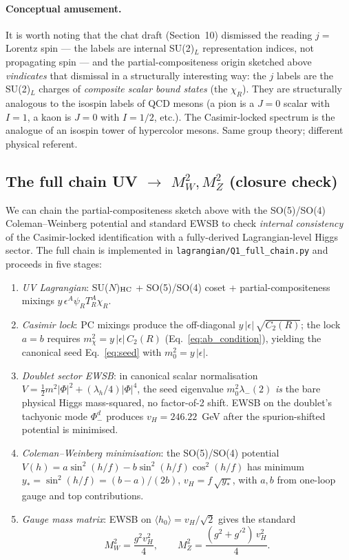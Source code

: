 \documentclass[11pt,a4paper]{article}
\newcommand{\Cas}{C_2}
\begin{document}
\paragraph{Conceptual amusement.} It is worth noting that the chat
draft (Section~10) dismissed the reading $j = $ Lorentz spin --- the
labels are internal SU(2)$_L$ representation indices, not propagating
spin --- and the partial-compositeness origin sketched above
\emph{vindicates} that dismissal in a structurally interesting way: the
$j$ labels are the SU(2)$_L$ charges of \emph{composite scalar bound
states} (the $\chi_R$). They are structurally analogous to the isospin
labels of QCD mesons (a pion is a $J=0$ scalar with $I=1$, a kaon is
$J=0$ with $I=1/2$, etc.). The Casimir-locked spectrum is the analogue
of an isospin tower of hypercolor mesons. Same group theory; different
physical referent.

\subsection*{The full chain UV $\to$ $M_W^2, M_Z^2$ (closure check)}

We can chain the partial-compositeness sketch above with the
SO(5)/SO(4) Coleman--Weinberg potential and standard EWSB to check
\emph{internal consistency} of the Casimir-locked identification with a
fully-derived Lagrangian-level Higgs sector. The full chain is
implemented in \texttt{lagrangian/Q1\_full\_chain.py} and proceeds
in five stages:

\begin{enumerate}
\item \emph{UV Lagrangian}: SU($N$)$_{\rm HC}$ + SO(5)/SO(4) coset +
   partial-compositeness mixings $y\,\epsilon^A \psi_R T^A_R \chi_R$.
\item \emph{Casimir lock}: PC mixings produce the off-diagonal
   $y\,|\epsilon|\,\sqrt{\Cas(R)}$; the lock $a = b$ requires
   $m_\chi^2 = y\,|\epsilon|\,\Cas(R)$ (Eq.~\eqref{eq:ab_condition}),
   yielding the canonical seed Eq.~\eqref{eq:seed} with
   $m_0^2 = y\,|\epsilon|$.
\item \emph{Doublet sector EWSB}: in canonical scalar normalisation
   $V = \tfrac{1}{2} m^2 |\Phi|^2 + (\lambda_h/4)|\Phi|^4$, the seed
   eigenvalue $m_0^2 \lambda_-(2)$ \emph{is} the bare physical
   Higgs mass-squared, no factor-of-2 shift. EWSB on the doublet's
   tachyonic mode $\Phi_-^d$ produces $v_H = 246.22$~GeV after
   the spurion-shifted potential is minimised.
\item \emph{Coleman--Weinberg minimisation}: the SO(5)/SO(4) potential
   $V(h) = a \sin^2(h/f) - b \sin^2(h/f)\cos^2(h/f)$ has minimum
   $y_* = \sin^2(h/f) = (b-a)/(2b)$, $v_H = f\,\sqrt{y_*}$, with
   $a, b$ from one-loop gauge and top contributions.
\item \emph{Gauge mass matrix}: EWSB on $\langle h_0\rangle = v_H/\sqrt{2}$
   gives the standard
   \begin{equation}
     M_W^2 = \frac{g^2 v_H^2}{4},\qquad
     M_Z^2 = \frac{(g^2 + g'^2)\,v_H^2}{4}.
   \label{eq:gauge_from_vH}
   \end{equation}
\end{enumerate}
\end{document}
